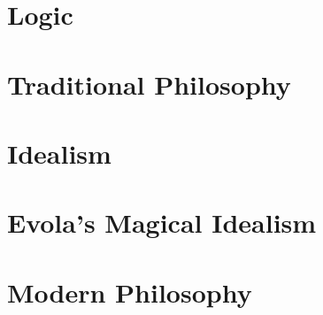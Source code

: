 \documentclass[a4paper,12pt,twoside]{book}
\begin{document}
\chapter{Logic}



\chapter{Traditional Philosophy}












\chapter{Idealism}











\chapter{Evola's Magical Idealism}








\chapter{Modern Philosophy}



\end{document}
